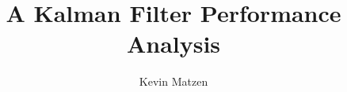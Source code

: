 \documentclass[10pt,twocolumn,letterpaper]{article}
\begin{document}


\title{A Kalman Filter Performance Analysis}

\author{Kevin Matzen}

\maketitle







{\small


}
\end{document}
